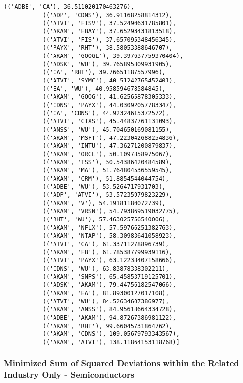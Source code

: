 \documentclass[11pt]{article}
\begin{document}
\begin{Verbatim}[commandchars=\\\{\}]
           (('ADBE', 'CA'), 36.511020170463276),
           (('ADP', 'CDNS'), 36.91168258814312),
           (('ATVI', 'FISV'), 37.52490631785801),
           (('AKAM', 'EBAY'), 37.65293431813518),
           (('ATVI', 'FIS'), 37.657095348456345),
           (('PAYX', 'RHT'), 38.58053388646707),
           (('AKAM', 'GOOGL'), 39.397637759370404),
           (('ADSK', 'WU'), 39.765895809931905),
           (('CA', 'RHT'), 39.76651187557996),
           (('ATVI', 'SYMC'), 40.51242765452401),
           (('EA', 'WU'), 40.958594678584845),
           (('AKAM', 'GOOG'), 41.62565878305333),
           (('CDNS', 'PAYX'), 44.03092057783347),
           (('CA', 'CDNS'), 44.92324615372572),
           (('ATVI', 'CTXS'), 45.44837761131093),
           (('ANSS', 'WU'), 45.704650169081155),
           (('AKAM', 'MSFT'), 47.223042688254836),
           (('AKAM', 'INTU'), 47.36271200879837),
           (('AKAM', 'ORCL'), 50.1097858975067),
           (('AKAM', 'TSS'), 50.54386420484589),
           (('AKAM', 'MA'), 51.764804536559545),
           (('AKAM', 'CRM'), 51.8854544044754),
           (('ADBE', 'WU'), 53.5264717931703),
           (('ADP', 'ATVI'), 53.57235979823229),
           (('AKAM', 'V'), 54.19181180072739),
           (('AKAM', 'VRSN'), 54.793869519032775),
           (('RHT', 'WU'), 57.463025756540006),
           (('AKAM', 'NFLX'), 57.59766251382763),
           (('AKAM', 'NTAP'), 58.30983641058923),
           (('ATVI', 'CA'), 61.33711278896739),
           (('AKAM', 'FB'), 61.785387799939116),
           (('ATVI', 'PAYX'), 63.12238407158666),
           (('CDNS', 'WU'), 63.83878338302211),
           (('AKAM', 'SNPS'), 65.45853719125701),
           (('ADSK', 'AKAM'), 79.44756182547066),
           (('AKAM', 'EA'), 81.89300127017108),
           (('ATVI', 'WU'), 84.52634607386977),
           (('AKAM', 'ANSS'), 84.95618664334728),
           (('ADBE', 'AKAM'), 94.87267386981122),
           (('AKAM', 'RHT'), 99.66045731864762),
           (('AKAM', 'CDNS'), 109.05679793343567),
           (('AKAM', 'ATVI'), 138.11864153118768)]
\end{Verbatim}
            
    \subsubsection{Minimized Sum of Squared Deviations within the Related
Industry Only -
Semiconductors}\label{minimized-sum-of-squared-deviations-within-the-related-industry-only---semiconductors}
\end{document}
